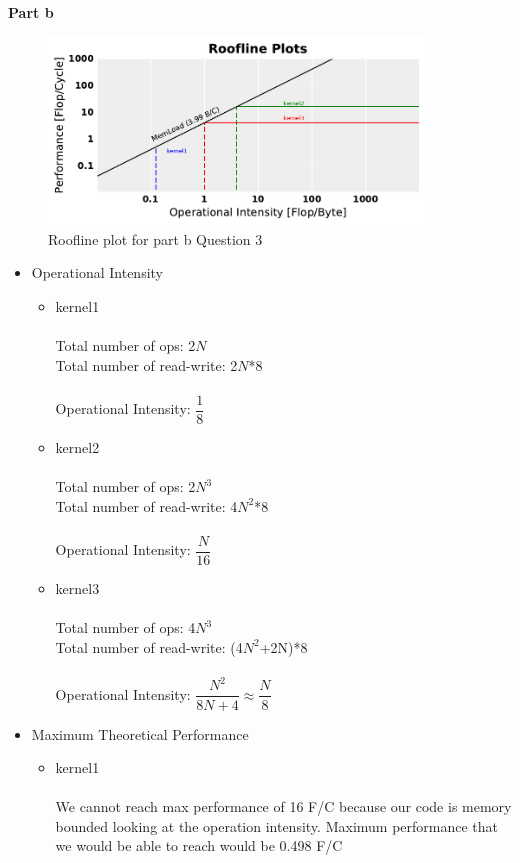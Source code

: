 \documentclass[letterpaper, 11pt]{article}
\begin{document}
\textbf{Part b}
\begin{figure}[h!]
	\centering
    \includegraphics[width=100mm]{part2}
    \caption{Roofline plot for part b Question 3}
\end{figure}
\begin{itemize}
\item Operational Intensity
\begin{itemize}
\item kernel1 \\ \\
Total number of ops: 2$N$ \\
Total number of read-write: 2$N$*8 \\ \\
Operational Intensity: $\dfrac{1}{8}$ \\
\item kernel2 \\ \\ 
Total number of ops: 2$N^3$ \\
Total number of read-write: 4$N^2$*8 \\ \\
Operational Intensity: $\dfrac{N}{16}$\\
\item kernel3 \\ \\
Total number of ops: 4$N^3$ \\
Total number of read-write: (4$N^2$+2N)*8 \\ \\
Operational Intensity: $\dfrac{N^2}{8N+4} \approx \dfrac{N}{8} $\\
\end{itemize}
\item Maximum Theoretical Performance
\begin{itemize}
\item kernel1 \\ \\
We cannot reach max performance of 16 F/C because our code is memory bounded looking at the operation intensity. Maximum performance that we would be able to reach would be 0.498 F/C

\end{itemize}
\end{itemize}
\end{document}
